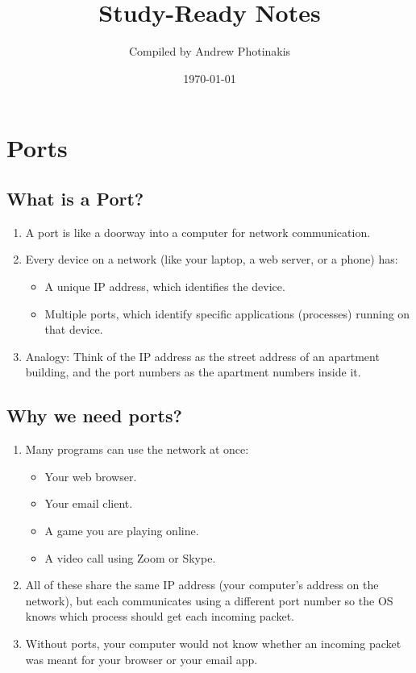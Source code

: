 \documentclass[12pt]{article}
\title{\TOPICTITLE\\\large Study-Ready Notes}
\author{Compiled by Andrew Photinakis}
\date{\today}
\begin{document}
\maketitle
\tableofcontents
\newpage

\section{Ports}

\subsection{What is a Port?}
\begin{enumerate}
    \item A port is like a doorway into a computer for network communication.
    \item Every device on a network (like your laptop, a web server, or a phone) has:
          \begin{itemize}
              \item A unique IP address, which identifies the device.
              \item Multiple ports, which identify specific applications (processes) running on that device.
          \end{itemize}
    \item Analogy: Think of the IP address as the street address of an apartment building, and the port numbers as the apartment numbers inside it.
\end{enumerate}

\subsection{Why we need ports?}
\begin{enumerate}
    \item Many programs can use the network at once:
          \begin{itemize}
              \item Your web browser.
              \item Your email client.
              \item A game you are playing online.
              \item A video call using Zoom or Skype.
          \end{itemize}
    \item All of these share the same IP address (your computer's address on the network), but each communicates using a different port number so the OS knows which process should get each incoming packet.
    \item Without ports, your computer would not know whether an incoming packet was meant for your browser or your email app.
\end{enumerate}
\end{document}
